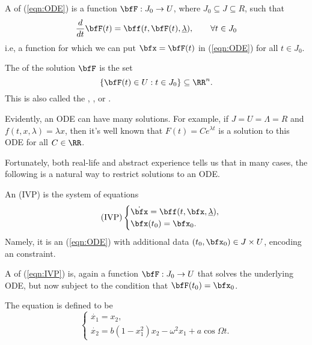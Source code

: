 \documentclass{article}
\newcommand*\ullam{\underline{\lambda}}
\begin{document}
\begin{definition}
A  of (\ref{eqn:ODE}) is a function $\bfF: J_0 \to U$, where $J_0 \subseteq J \subseteq R$, such that 
    \[
        \frac{d}{dt}\bfF(t)
        =
        \bff(t, \bfF(t), \ullam),\qquad 
        \forall t \in J_0
    \]
    i.e, a function for which we can put $\bfx = \bfF(t)$ in (\ref{eqn:ODE}) for all $t \in J_0$.

    The  of the solution $\bfF$ is the set
    \[
        \{
            \bfF(t) \in U: t \in J_0
        \}
        \subseteq \RR^n.
    \]
    This is also called the , , or .
\end{definition}

Evidently, an ODE can have many solutions.
For example, if $J = U = \Lambda = R$ and $f(t,x,\lambda) = \lambda x$, then it's well known that $F(t) = Ce^{\lambda t}$ is a solution to this ODE for all $C \in \RR$.

Fortunately, both real-life and abstract experience tells us that in many cases, the following is a natural way to restrict solutions to an ODE.

\begin{definition}
    An  (IVP) is the system of equations
    \begin{equation}
        \label{eqn:IVP}
        \tag{IVP}
        \begin{cases}
            \dot\bfx = \bff(t, \bfx, \ullam), \\
            \bfx(t_0) = \bfx_0.
        \end{cases}
    \end{equation}
    Namely, it is an (\ref{eqn:ODE}) with additional data $(t_0,\bfx_0) \in J \times U$, encoding an  constraint.

    A  of (\ref{eqn:IVP}) is, again a function $\bfF: J_0 \to U$ that solves the underlying ODE, but now subject to the condition that $\bfF(t_0) = \bfx_0$.
\end{definition}

\begin{example}
    The  equation is defined to be
    \begin{equation}
        \label{eqn:ForcedVanDerPol}
        \tag{ForcedVanDerPol}
        \begin{cases}
            \dot{x_1} = x_2, \\
            \dot{x_2} = b(1-x_1^2)x_2- \omega^2x_1 + a \cos \Omega t.
        \end{cases}
    \end{equation}
\end{example}
\end{document}
